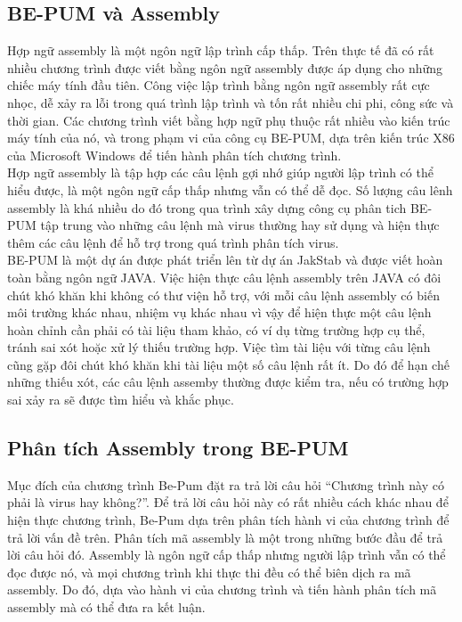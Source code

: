  \subsection{BE-PUM và Assembly}
  Hợp ngữ assembly là một ngôn ngữ lập trình cấp thấp. Trên thực tế đã có rất nhiều chương trình được viết bằng ngôn ngữ assembly được áp dụng cho những chiếc máy tính đầu tiên. Công việc lập trình bằng ngôn ngữ assembly rất cực nhọc, dễ xảy ra lỗi trong quá trình lập trình và tốn rất nhiều chi phi, công sức và thời gian. Các chương trình viết bằng hợp ngữ phụ thuộc rất nhiều vào kiến trúc máy tính của nó, và trong phạm vi của công cụ BE-PUM, dựa trên kiến trúc X86 của Microsoft Windows để tiến hành phân tích chương trình.\\

Hợp ngữ assembly là tập hợp các câu lệnh gợi nhớ giúp người lập trình có thể hiểu được, là một ngôn ngữ cấp thấp nhưng vẫn có thể dễ đọc. Số lượng câu lênh assembly là khá nhiều do đó trong qua trình xây dựng công cụ phân tich BE-PUM tập trung vào những câu lệnh mà virus thường hay sử dụng và hiện thực thêm các câu lệnh để hỗ trợ trong quá trình phân tích virus.\\

BE-PUM là một dự án được phát triển lên từ dự án JakStab và được viết hoàn toàn bằng ngôn ngữ JAVA. Việc hiện thực câu lệnh assembly trên JAVA có đôi chút khó khăn khi không có thư viện hỗ trợ, với mỗi câu lệnh assembly có biến môi trường khác nhau, nhiệm vụ khác nhau vì vậy để hiện thực một câu lệnh hoàn chỉnh cần phải có tài liệu tham khảo, có ví dụ từng trường hợp cụ thể, tránh sai xót hoặc xử lý thiếu trường hợp. Việc tìm tài liệu với từng câu lệnh cũng gặp đôi chút khó khăn khi tài liệu một số câu lệnh rất ít. Do đó để hạn chế những thiếu xót, các câu lệnh assemby thường được kiểm tra, nếu có trường hợp sai xảy ra sẽ được tìm hiểu và khắc phục.\\

  \subsection{Phân tích Assembly trong BE-PUM}
  Mục đích của chương trình Be-Pum đặt ra trả lời câu hỏi “Chương trình này có phải là virus hay không?”. Để trả lời câu hỏi này có rất nhiều cách khác nhau để hiện thực chương trình, Be-Pum dựa trên phân tích hành vi của chương trình để trả lời vấn đề trên. Phân tích mã assembly là một trong những bước đầu để trả lời câu hỏi đó. Assembly là ngôn ngữ cấp thấp nhưng người lập trình vẫn có thể đọc được nó, và mọi chương trình khi thực thi đều có thể biên dịch ra mã assembly. Do đó, dựa vào hành vi của chương trình và tiến hành phân tích mã assembly mà có thể đưa ra kết luận.\\

